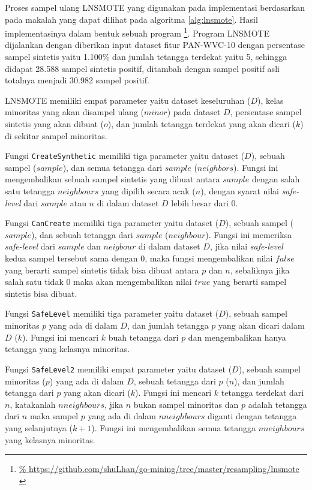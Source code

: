 Proses sampel ulang LNSMOTE yang digunakan pada implementasi berdasarkan
pada makalah
\textcite{maciejewski2011local}
yang dapat dilihat pada algoritma
\ref{alg:lnsmote}.
Hasil implementasinya dalam bentuk sebuah program
\footnote{\url{%
https://github.com/shuLhan/go-mining/tree/master/resampling/lnsmote
}}.
Program LNSMOTE dijalankan dengan diberikan input dataset fitur PAN-WVC-10
dengan persentase sampel sintetis yaitu 1.100\% dan jumlah tetangga terdekat
yaitu 5, sehingga didapat 28.588 sampel sintetis positif, ditambah dengan
sampel positif asli totalnya menjadi 30.982 sampel positif.

	

LNSMOTE memiliki empat parameter yaitu dataset keseluruhan ($D$), kelas
minoritas yang akan disampel ulang ($minor$) pada dataset $D$, persentase
sampel sintetis yang akan dibuat ($o$), dan jumlah tetangga terdekat yang akan
dicari ($k$) di sekitar sampel minoritas.

Fungsi \texttt{CreateSynthetic} memiliki tiga parameter yaitu dataset ($D$),
sebuah sampel ($sample$), dan semua tetangga dari $sample$ ($neighbors$).
Fungsi ini mengembalikan sebuah sampel sintetis yang dibuat antara $sample$
dengan salah satu tetangga $neighbours$ yang dipilih secara acak ($n$), dengan
syarat nilai \textit{safe-level} dari $sample$ atau $n$ di dalam dataset $D$
lebih besar dari $0$.

Fungsi \texttt{CanCreate} memiliki tiga parameter yaitu dataset ($D$), sebuah
sampel ($sample$), dan sebuah tetangga dari $sample$ ($neighbour$).
Fungsi ini memeriksa \textit{safe-level} dari $sample$ dan $neigbour$ di dalam
dataset $D$, jika nilai \textit{safe-level} kedua sampel tersebut sama dengan
0, maka fungsi mengembalikan nilai $false$ yang berarti sampel sintetis tidak
bisa dibuat antara $p$ dan $n$, sebaliknya jika salah satu tidak 0
maka akan mengembalikan nilai $true$ yang berarti sampel sintetis bisa dibuat.

Fungsi \texttt{SafeLevel} memiliki tiga parameter yaitu dataset ($D$), sebuah
sampel minoritas $p$ yang ada di dalam $D$, dan jumlah tetangga $p$ yang akan dicari
dalam $D$ ($k$).
Fungsi ini mencari $k$ buah tetangga dari $p$ dan mengembalikan hanya tetangga
yang kelasnya minoritas.

Fungsi \texttt{SafeLevel2} memiliki empat parameter yaitu dataset ($D$), sebuah
sampel minoritas ($p$) yang ada di dalam $D$, sebuah tetangga dari $p$ ($n$),
dan jumlah tetangga dari $p$ yang akan dicari ($k$).
Fungsi ini mencari $k$ tetangga terdekat dari $n$, katakanlah $nneighbours$,
jika $n$ bukan sampel minoritas dan $p$ adalah tetangga dari $n$ maka sampel
$p$ yang ada di dalam $nneighbours$ diganti dengan tetangga yang selanjutnya
($k+1$).
Fungsi ini mengembalikan semua tetangga $nneighbours$ yang kelasnya minoritas.

